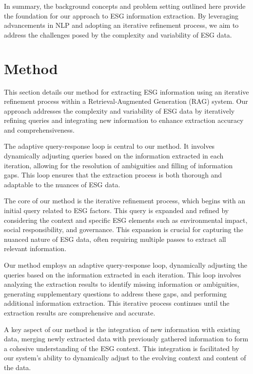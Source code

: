 \documentclass{article} %
\begin{document}
In summary, the background concepts and problem setting outlined here provide the foundation for our approach to ESG information extraction. By leveraging advancements in NLP and adopting an iterative refinement process, we aim to address the challenges posed by the complexity and variability of ESG data.

\section{Method}
\label{sec:method}

This section details our method for extracting ESG information using an iterative refinement process within a Retrieval-Augmented Generation (RAG) system. Our approach addresses the complexity and variability of ESG data by iteratively refining queries and integrating new information to enhance extraction accuracy and comprehensiveness.

The adaptive query-response loop is central to our method. It involves dynamically adjusting queries based on the information extracted in each iteration, allowing for the resolution of ambiguities and filling of information gaps. This loop ensures that the extraction process is both thorough and adaptable to the nuances of ESG data.

The core of our method is the iterative refinement process, which begins with an initial query related to ESG factors. This query is expanded and refined by considering the context and specific ESG elements such as environmental impact, social responsibility, and governance. This expansion is crucial for capturing the nuanced nature of ESG data, often requiring multiple passes to extract all relevant information.

Our method employs an adaptive query-response loop, dynamically adjusting the queries based on the information extracted in each iteration. This loop involves analyzing the extraction results to identify missing information or ambiguities, generating supplementary questions to address these gaps, and performing additional information extraction. This iterative process continues until the extraction results are comprehensive and accurate.

A key aspect of our method is the integration of new information with existing data, merging newly extracted data with previously gathered information to form a cohesive understanding of the ESG context. This integration is facilitated by our system's ability to dynamically adjust to the evolving context and content of the data.
\end{document}
